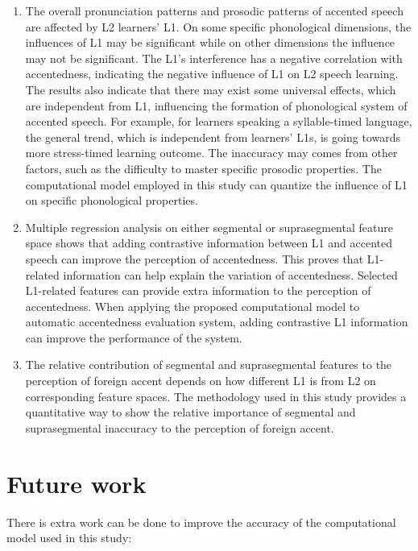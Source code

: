 \begin{enumerate}
\item The overall pronunciation patterns and prosodic patterns of accented speech are affected by L2 learners' L1. On some specific phonological dimensions, the influences of L1 may be significant while on other dimensions the influence may not be significant. The L1's interference has a negative correlation with accentedness, indicating the negative influence of L1 on L2 speech learning. The results also indicate that there may exist some universal effects, which are independent from L1, influencing the formation of phonological system of accented speech. For example, for learners speaking a syllable-timed language, the general trend, which is independent from learners' L1s, is going towards more stress-timed learning outcome. The inaccuracy may comes from other factors, such as the difficulty to master specific prosodic properties. The computational model employed in this study can quantize the influence of L1 on specific phonological properties.
\item Multiple regression analysis on either segmental or suprasegmental feature space shows that adding contrastive information between L1 and accented speech can improve the perception of accentedness. This proves that L1-related information can help explain the variation of accentedness. Selected L1-related features can provide extra information to the perception of accentedness. When applying the proposed computational model to automatic accentedness evaluation system, adding contrastive L1 information can improve the performance of the system.
\item The relative contribution of segmental and suprasegmental features to the perception of foreign accent depends on how different L1 is from L2 on corresponding feature spaces. The methodology used in this study provides a quantitative way to show the relative importance of segmental and suprasegmental inaccuracy to the perception of foreign accent.
\end{enumerate}


\section{Future work}

There is extra work can be done to improve the accuracy of the computational model used in this study:

